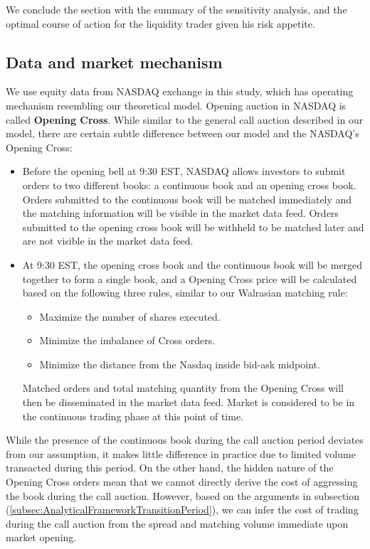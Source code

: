 We conclude the section with the summary of the sensitivity analysis, and the optimal course of action for the liquidity trader given his risk appetite.

\subsection{Data and market mechanism}

We use equity data from NASDAQ exchange in this study, which has operating mechanism resembling our theoretical model. Opening auction in NASDAQ is called \textbf{Opening Cross}. While similar to the general call auction described in our model, there are certain subtle difference between our model and the NASDAQ's Opening Cross:
\begin{itemize}
  \item Before the opening bell at 9:30 EST, NASDAQ allows investors to submit orders to two different books: a continuous book and an opening cross book. Orders submitted to the continuous book will be matched immediately and the matching information will be visible in the market data feed. Orders submitted to the opening cross book will be withheld to be matched later and are not visible in the market data feed.
  \item At 9:30 EST, the opening cross book and the continuous book will be merged together to form a single book, and a Opening Cross price will be calculated based on the following three rules, similar to our Walrasian matching rule:
        \begin{itemize}
          \item Maximize the number of shares executed.
          \item Minimize the imbalance of Cross orders.
          \item Minimize the distance from the Nasdaq inside bid-ask midpoint.
        \end{itemize}
        Matched orders and total matching quantity from the Opening Cross will then be disseminated in the market data feed. Market is considered to be in the continuous trading phase at this point of time.
\end{itemize}

While the presence of the continuous book during the call auction period deviates from our assumption, it makes little difference in practice due to limited volume transacted during this period. On the other hand, the hidden nature of the Opening Cross orders mean that we cannot directly derive the cost of aggressing the book during the call auction. However, based on the arguments in subsection (\ref{subsec:AnalyticalFrameworkTransitionPeriod}), we can infer the cost of trading during the call auction from the spread and matching volume immediate upon market opening.

